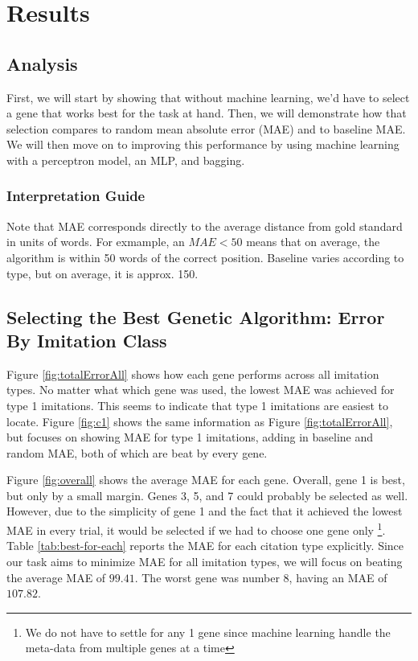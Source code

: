 \section {Results}
\label{results}

\subsection {Analysis}
First, we will start by showing that without machine learning, we'd have to select a gene that works best for the task at hand. Then, we will demonstrate how that selection compares to random mean absolute error (MAE) and to baseline MAE. We will then move on to improving this performance by using machine learning with a perceptron model, an MLP, and bagging.

\subsubsection{Interpretation Guide}
Note that MAE corresponds directly to the average distance from gold standard in units of words. For exmample, an $MAE < 50$ means that on average, the algorithm is within 50 words of the correct position. Baseline varies according to type, but on average, it is approx. 150.

\subsection{Selecting the Best Genetic Algorithm: Error By Imitation Class}
Figure \ref{fig:totalErrorAll} shows how each gene performs across all imitation types. No matter what which gene was used, the lowest MAE was achieved for type 1 imitations. This seems to indicate that type 1 imitations are easiest to locate. Figure \ref{fig:c1} shows the same information as Figure \ref{fig:totalErrorAll}, but focuses on showing MAE for type 1 imitations, adding in baseline and random MAE, both of which are beat by every gene.

Figure \ref{fig:overall} shows the average MAE for each gene. Overall, gene 1 is best, but only by a small margin. Genes 3, 5, and 7 could probably be selected as well. However, due to the simplicity of gene 1 and the fact that it achieved the lowest MAE in every trial, it would be selected if we had to choose one gene only \footnote{We do not have to settle for any 1 gene since machine learning handle the meta-data from multiple genes at a time}. Table \ref{tab:best-for-each} reports the MAE for each citation type explicitly. Since our task aims to minimize MAE for all imitation types, we will focus on beating the average MAE of $99.41$. The worst gene was number 8, having an MAE of $107.82$. 

